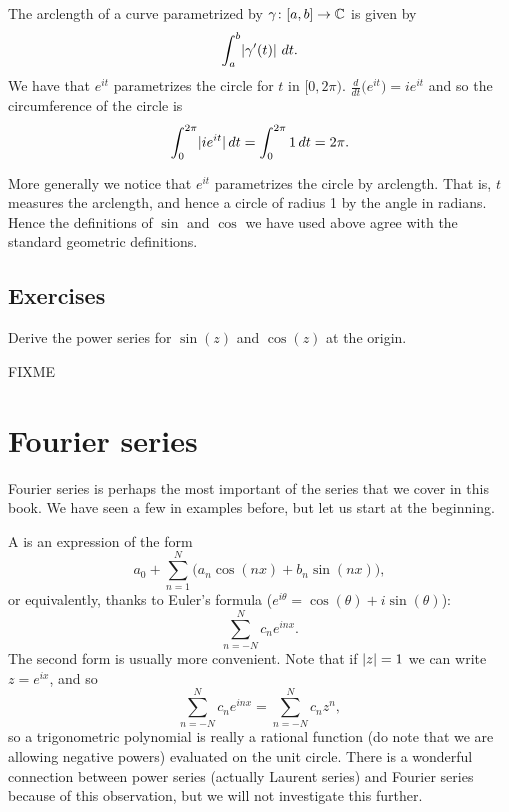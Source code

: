 The arclength of a curve parametrized by $\gamma \colon [a,b] \to {\mathbb{C}}$ is given
by
\begin{equation*}
\int_a^b \lvert {\gamma'(t)} \rvert ~ dt .
\end{equation*}
We have that $e^{it}$ parametrizes the circle for $t$ in $[0,2\pi)$.
$\frac{d}{dt} \bigl( e^{it} \bigr) = ie^{it}$ and so the circumference of the
circle is
\begin{equation*}
\int_0^{2\pi} \lvert {i e^{it}} \rvert \, dt
=
\int_0^{2\pi} 1 \, dt  = 2\pi .
\end{equation*}

More generally we notice that $e^{it}$ parametrizes the circle by arclength.
That is, $t$ measures the arclength, and hence a circle of radius 1 by
the angle in radians.  Hence the definitions of $\sin$ and $\cos$ we have
used above agree with the standard geometric definitions.

\subsection{Exercises}

\begin{exercise}
Derive the power series for $\sin(z)$ and $\cos(z)$ at the origin.
\end{exercise}

FIXME

\sectionnewpage
\section{Fourier series}
\label{sec:FIXME}


Fourier series is perhaps the most important of the series that we cover in
this book.  We have seen a few in examples before, but let us start
at the beginning.

A \emph{} is an expression of the form
\begin{equation*}
a_0 + \sum_{n=1}^N \bigl(a_n \cos(nx) + b_n \sin(nx) \bigr),
\end{equation*}
or equivalently, thanks to Euler's formula ($e^{i\theta} = \cos(\theta) + i
\sin(\theta)$):
\begin{equation*}
\sum_{n=-N}^N c_n e^{inx} .
\end{equation*}
The second form is usually more convenient.  Note that if
$\lvert {z} \rvert=1$ we can write $z = e^{ix}$, and so
\begin{equation*}
\sum_{n=-N}^N c_n e^{inx} = 
\sum_{n=-N}^N c_n z^n ,
\end{equation*}
so a trigonometric polynomial is really a rational function (do note that
we are allowing negative powers) evaluated on the unit circle.  There is
a wonderful connection between power series (actually Laurent series) and
Fourier series because of this observation, but we will not investigate this further.

